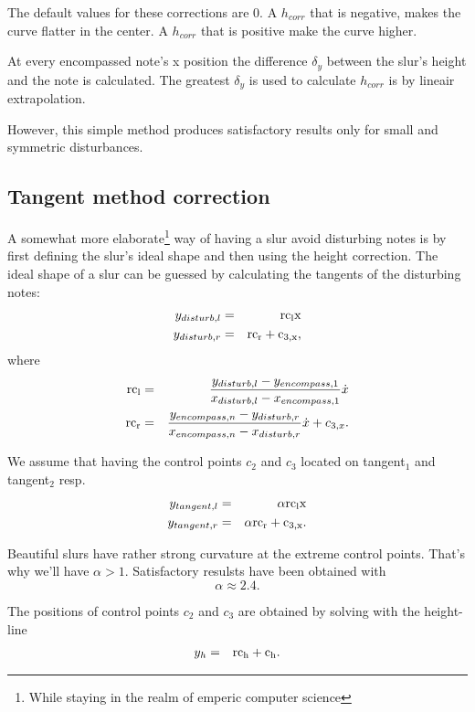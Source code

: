\documentclass{article}
\begin{document}
The default values for these corrections are $0$.  A $h_{corr}$ that is
negative, makes the curve flatter in the center.  A $h_{corr}$ that is
positive make the curve higher. 

At every encompassed note's x position the difference $\delta _y$ 
between the slur's height and the note is calculated.  The greatest 
$\delta _y$ is used to calculate $h_{corr}$ is by lineair extrapolation.

However, this simple method produces satisfactory results only for 
small and symmetric disturbances.


\subsection{Tangent method correction}

A somewhat more elaborate\footnote{While staying in the realm 
of emperic computer science} way of having a slur avoid 
disturbing notes is by first defining the slur's ideal shape 
and then using the height correction.  The ideal shape of a 
slur can be guessed by calculating the tangents of the disturbing 
notes:
\begin{eqnarray*}
  y_{disturb,l} &=& \rm{rc}_l x\\
  y_{disturb,r} &=& \rm{rc}_r + c_{3,x},
\end{eqnarray*}
where
\begin{eqnarray*}
  \rm{rc}_l &=& \frac{y_{disturb,l} - y_{encompass,1}}
    {x_{disturb,l} - x_{encompass,1}}\dot x\\
  \rm{rc}_r &=& \frac{y_{encompass,n} - y_{disturb,r}}
    {x_{encompass,n} - x_{disturb,r}} \dot x + c_{3,x}.
\end{eqnarray*}

We assume that having the control points $c_2$ and $c_3$ located 
on tangent$_1$ and tangent$_2$ resp. 
\begin{eqnarray*}
  y_{tangent,l} &=& \alpha \rm{rc}_l x\\
  y_{tangent,r} &=& \alpha \rm{rc}_r + c_{3,x}.
\end{eqnarray*}

Beautiful slurs have rather strong curvature at the extreme
control points.  That's why we'll have $\alpha > 1$.
Satisfactory resulsts have been obtained with
$$
  \alpha \approx 2.4.
$$

The positions of control points $c_2$ and $c_3$ are obtained
by solving with the height-line
\begin{eqnarray*}
  y_h &=& \rm{rc}_h + c_h.
\end{eqnarray*}
\end{document}
